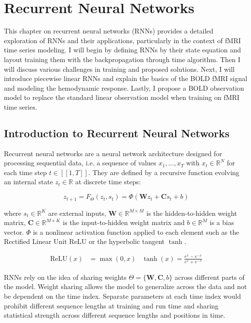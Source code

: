 \FloatBarrier
\chapter{Recurrent Neural Networks} 

This chapter on recurrent neural networks (RNNs) provides a detailed exploration of RNNs and 
their applications, particularly in the context of fMRI time series modeling. I will begin by defining RNNs by their state equation and 
layout training them with the backpropagation through time algorithm. Then I will discuss various challenges in training and proposed solutions.
Next, I will introduce piecewise linear RNNs and explain the basics of the BOLD fMRI signal and modeling the hemodynamic response. Lastly, I 
propose a BOLD observation model to replace the standard linear observation model when training on fMRI time series. 

\section{Introduction to Recurrent Neural Networks}

Recurrent neural networks are a neural network architecture designed for processing sequential data, 
i.e. a sequence of values $x_{1}, ..., x_{T}$ with $x_{t} \in \mathbb{R}^{N}$ for each time step $t \in [\![ 1, T ]\!]$.
They are defined by a recursive function evolving an internal state $z_{t} \in \mathbb{R}$ at discrete time steps:

\begin{equation}
    z_{t+1} = F_{\Theta}(z_{t}, s_{t}) = \Phi(\boldsymbol{W} z_{t} + \boldsymbol{C} s_{t} + b)
    \label{eq:vanilla_rnn}
\end{equation}

where $s_t \in \mathbb{R}^K$ are external inputs, $\boldsymbol{W} \in \mathbb{R}^{M \times M}$ is the hidden-to-hidden weight matrix,
 $\boldsymbol{C} \in \mathbb{R}^{M \times K}$ is the input-to-hidden weight matrix and $b \in \mathbb{R}^{M}$ is a bias vector.
$\Phi$ is a nonlinear activation function applied to each element such as the Rectified Linear Unit ReLU or the hyperbolic tangent $\tanh$.

\begin{align*}
    \text{ReLU}(x) &= \max(0,x) & \tanh(x) = \frac{e^{x} - e^{-x}}{e^{x} + e^{-x}}
\end{align*}

RNNs rely on the idea of sharing weights $\Theta = \{ \boldsymbol{W}, \boldsymbol{C}, b \}$ across different parts of the model. 
Weight sharing allows the model to generalize across the data and not be dependent on the time index. Separate parameters at each time index 
would prohibit different sequence lengths at training and run time and sharing statistical strength across different sequence lengths and positions in time.

